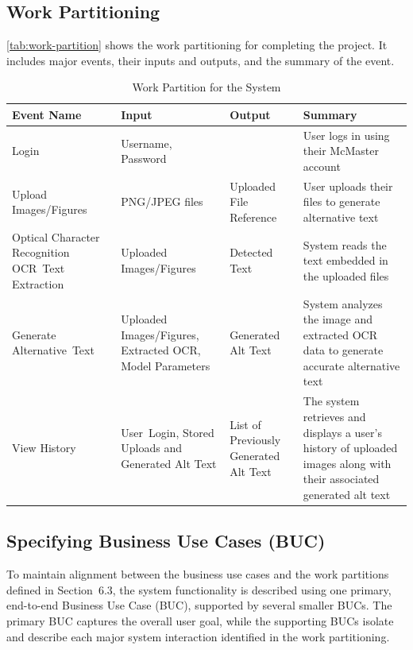 \documentclass[12pt]{article}
\begin{document}
\subsection{Work Partitioning}
\autoref{tab:work-partition} shows the work partitioning for
completing the project. It includes major events,
their inputs and outputs, and the summary of the event.

\setcounter{table}{0}
\begin{table}[H]
  \centering
  \caption{Work Partition for the System}
  \label{tab:work-partition}
  \begin{tabular}{p{3cm}|p{3cm}|p{3cm}|p{4cm}}
    \midrule
    \textbf{Event Name} & \textbf{Input} & \textbf{Output} & \textbf{Summary} \\
    \midrule
    Login & Username, Password &  & User logs in using their McMaster account \\
    \midrule
    Upload \mbox{Images/Figures} & PNG/JPEG files & Uploaded File
    Reference & User uploads their files to generate alternative text \\
    \midrule
    Optical Character Recognition \mbox{OCR Text} \mbox{Extraction} & Uploaded
    \mbox{Images/Figures} & Detected Text & System reads the text
    embedded in the uploaded files \\
    \midrule
    Generate \mbox{Alternative Text} & Uploaded
    \mbox{Images/Figures}, Extracted OCR, Model Parameters &
    Generated Alt Text & System analyzes the image and extracted OCR data to
    generate accurate alternative text \\
    \midrule
    View History & \mbox{User Login,} Stored Uploads and Generated
    Alt Text & List of Previously Generated Alt Text & The system
    retrieves and displays a user’s history of uploaded images along
    with their associated generated alt text \\
    \midrule
  \end{tabular} 
\end{table}

\subsection{Specifying Business Use Cases (BUC)}

To maintain alignment between the business use cases and the work
partitions defined in Section~6.3, the system functionality is
described using one primary, end-to-end Business Use Case (BUC),
supported by several smaller BUCs. The primary BUC captures the
overall user goal, while the supporting BUCs isolate and describe
each major system interaction identified in the work partitioning.
\end{document}
